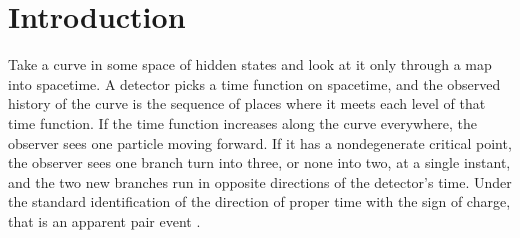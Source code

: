 \documentclass[aps,pre,reprint,nofootinbib,floatfix]{revtex4-2}
\begin{document}
\begin{abstract}
worldlines the observed branch count changed by minus two, zero, or
plus two and never by anything else.  Declaring one branch class
invisible produced 63 apparent decays with missing energy whose counts
the consumer's own detector model predicted exactly, so apparent decay
here measures what a consumer cannot see.  Lifetimes in this family are
not memoryless, their coefficient of variation measuring 0.159 against
the value one an exponential requires.  The founding question is then
answered under seal for one observable.  A deterministic crossing of a
declared field profile is exponentially suppressed with an exponent
fixed by the distance to the field's nearest complex singularity, four
fitted values agreeing within 1.07 percent across widths spanning a
factor of 2.56, with no distribution anywhere whose tail could be
responsible.  The observable is a per-crossing transfer and not an
event rate, and nothing here is evidence that physical pair creation or
decay works this way.
\end{abstract}

\maketitle

\section{Introduction}
\label{sec:intro}

Take a curve in some space of hidden states and look at it only
through a map into spacetime.  A detector picks a time function on
spacetime, and the observed history of the curve is the sequence of
places where it meets each level of that time function.  If the time
function increases along the curve everywhere, the observer sees one
particle moving forward.  If it has a nondegenerate critical point, the
observer sees one branch turn into three, or none into two, at a single
instant, and the two new branches run in opposite directions of the
detector's time.  Under the standard identification of the direction of
proper time with the sign of charge, that is an apparent pair event
\cite{Stueckelberg1941, Feynman1949}.
\end{document}
